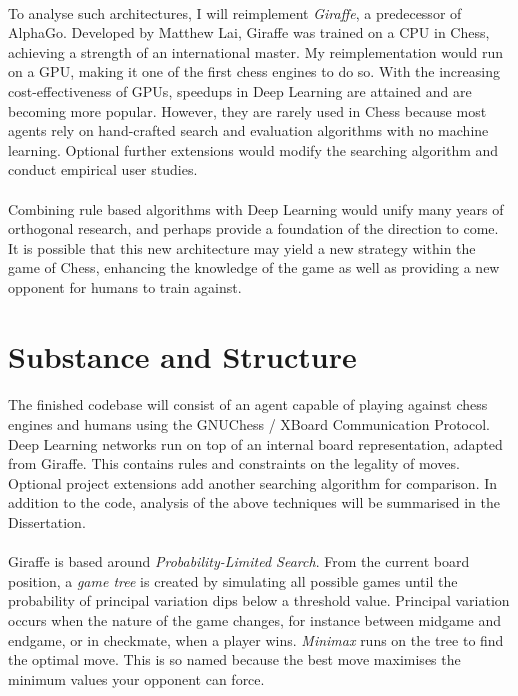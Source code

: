 \documentclass[12pt,a4paper]{book}
\begin{document}
\paragraph{}To analyse such architectures, I will reimplement \textit{Giraffe}, a predecessor of AlphaGo. Developed by Matthew Lai, Giraffe was trained on a CPU in Chess, achieving a strength of an international master. \cite{giraffe} My reimplementation would run on a GPU, making it one of the first chess engines to do so. With the increasing cost-effectiveness of GPUs, speedups in Deep Learning are attained and are becoming more popular. However, they are rarely used in Chess because most agents rely on hand-crafted search and evaluation algorithms with no machine learning. Optional further extensions would modify the searching algorithm and conduct empirical user studies.

\paragraph{}Combining rule based algorithms with Deep Learning would unify many years of orthogonal research, and perhaps provide a foundation of the direction to come. It is possible that this new architecture may yield a new strategy within the game of Chess, enhancing the knowledge of the game as well as providing a new opponent for humans to train against.

\section*{Substance and Structure}

\paragraph{}The finished codebase will consist of an agent capable of playing against chess engines and humans using the GNUChess / XBoard Communication Protocol. Deep Learning networks run on top of an internal board representation, adapted from Giraffe. This contains rules and constraints on the legality of moves. Optional project extensions add another searching algorithm for comparison. In addition to the code, analysis of the above techniques will be summarised in the Dissertation.

\paragraph{}Giraffe is based around \textit{Probability-Limited Search}. From the current board position, a \textit{game tree} is created by simulating all possible games until the probability of principal variation dips below a threshold value. Principal variation occurs when the nature of the game changes, for instance between midgame and endgame, or in checkmate, when a player wins. \textit{Minimax} runs on the tree to find the optimal move. This is so named because the best move maximises the minimum values your opponent can force.
\end{document}
